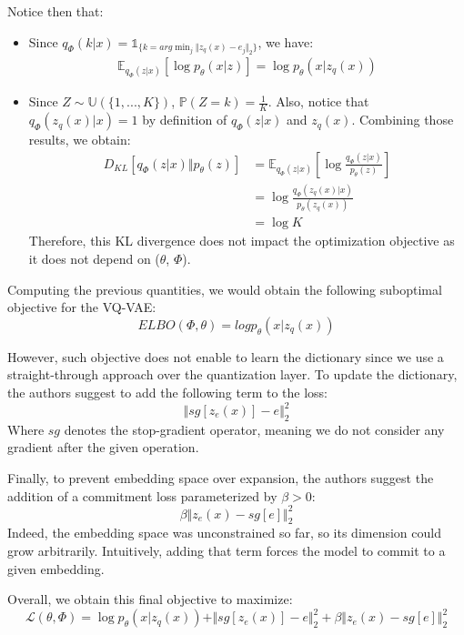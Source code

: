 Notice then that:
\begin{itemize}
    \item Since $q_{\Phi}(k|x) = \mathds{1}_{\{k = arg\min_{j} \Vert z_q(x) - e_j \Vert_2\}}$, we have:
          $$
          \begin{align}
              \mathbb{E}_{q_{\Phi}(z|x)}[\log p_{\theta}(x|z)] = \log p_{\theta}(x|z_q(x))
          \end{align}
          $$
    \item Since $Z \sim \mathbb{U}(\{1, ..., K\})$, $\mathbb{P}(Z=k) = \frac{1}{K}$.
          Also, notice that $q_{\Phi}(z_q(x)|x) = 1$ by definition of $q_{\Phi}(z|x)$ and $z_q(x)$.
          Combining those results, we obtain:
          $$
          \begin{align}
              D_{KL}[q_{\Phi}(z|x) \Vert p_{\theta}(z)] &= \mathbb{E}_{q_{\Phi}(z|x)}\left[\log \frac{q_{\Phi}(z|x)}{p_{\theta}(z)} \right] \\
              &= \log \frac{q_{\Phi}(z_q(x)|x)}{p_{\theta}(z_q(x))} \\
              &= \log K
          \end{align}
          $$
          Therefore, this KL divergence does not impact the optimization objective as it does not depend on ($\theta$, $\Phi$).
\end{itemize}

Computing the previous quantities, we would obtain the following suboptimal objective for the VQ-VAE:
$$
ELBO(\Phi, \theta) = log p_{\theta}(x|z_q(x))
$$

However, such objective does not enable to learn the dictionary since we use a straight-through approach over the quantization layer.
To update the dictionary, the authors suggest to add the following term to the loss:
$$
\Vert sg[z_e(x)] - e \Vert_2^2
$$
Where $sg$ denotes the stop-gradient operator, meaning we do not consider any gradient after the given operation.
\medskip

Finally, to prevent embedding space over expansion, the authors suggest the addition of a commitment loss parameterized by $\beta > 0$:
$$
\beta \Vert z_e(x) - sg[e] \Vert_2^2
$$
Indeed, the embedding space was unconstrained so far, so its dimension could grow arbitrarily.
Intuitively, adding that term forces the model to commit to a given embedding.
\medskip

Overall, we obtain this final objective to maximize:
$$
\mathcal{L}(\theta, \Phi) = \log p_{\theta}(x|z_q(x)) + \Vert sg[z_e(x)] - e \Vert_2^2 + \beta \Vert z_e(x) - sg[e] \Vert_2^2
$$

